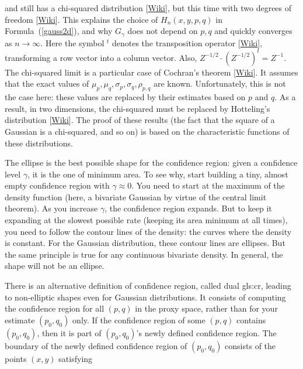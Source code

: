 \documentclass[10pt]{article}
\begin{document}
\begin{Exercise}
and still has a \textcolor{index}{chi-squared distribution} 
[\href{https://en.wikipedia.org/wiki/Chi-squared_distribution}{Wiki}], but this time with two 
\textcolor{index}{degrees of freedom} [\href{https://en.wikipedia.org/wiki/Degrees_of_freedom_(statistics)}{Wiki}]. This explains the choice of $H_n(x,y,p,q)$ in Formula~(\ref{gauss2d}), and why $G_\gamma$ does not depend on $p, q$ and quickly converges as $n\rightarrow\infty$.
Here the symbol $^t$ denotes the transposition operator [\href{https://en.wikipedia.org/wiki/Transpose}{Wiki}], transforming a row vector into a column vector. Also, $Z^{-1/2} \cdot (Z^{-1/2})^t=Z^{-1}$. The chi-squared limit 
is a particular case of 
\textcolor{index}{Cochran's theorem} [\href{https://bit.ly/3JzreHS}{Wiki}]. It assumes that the exact values of $\mu_p,\mu_q,\sigma_p,\sigma_q,\rho_{p,q}$ are known. Unfortunately,
 this is not the case here: these values are replaced by their estimates based on $p$ and $q$. As a result, in two dimensions, the chi-squared must be replaced 
by
\textcolor{index}{Hotteling's distribution} [\href{https://bit.ly/3uQ4a3t}{Wiki}].  The proof of these results (the fact that the square of a Gaussian is a chi-squared, and so on) 
is based on the \textcolor{index}{characteristic functions} of these distributions.

The ellipse is the best possible shape for the confidence region: given a confidence level $\gamma$, it is the one of minimum area. To see why, start building a tiny, almost empty confidence region with $\gamma\approx 0$. You need to start at the maximum of the density function (here, a bivariate Gaussian by virtue of the central limit theorem). As you increase $\gamma$, the confidence region expands. But to keep it expanding at the slowest possible rate (keeping its area minimum at all times), you need to follow the contour lines of the density: the curves where the density is constant. For the Gaussian distribution, these contour lines are ellipses. But the same principle is true for any continuous bivariate density. In general, the shape will  not be an ellipse.

There is an alternative definition of confidence region, 
called \textcolor{index}{dual} \gls{gls:cr}, 
leading to non-elliptic shapes even for Gaussian distributions. It consists of computing the confidence region for all $(p,q)$ in the proxy space, 
rather than for your estimate $(p_0,q_0)$ only. If the confidence region of some $(p,q)$ contains $(p_0,q_0)$, then it is part of $(p_0,q_0)$'s newly defined confidence region. The boundary of the newly defined confidence region of $(p_0,q_0)$ consists of the points $(x,y)$ satisfying 


\end{Exercise}
\end{document}
